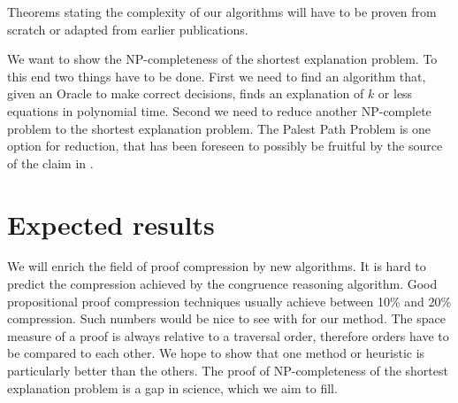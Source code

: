 Theorems stating the complexity of our algorithms will have to be proven from scratch or adapted from earlier publications.

We want to show the NP-completeness of the shortest explanation problem.
To this end two things have to be done.
First we need to find an algorithm that, given an Oracle to make correct decisions, finds an explanation of $k$ or less equations in polynomial time.
Second we need to reduce another NP-complete problem to the shortest explanation problem.
The Palest Path Problem \cite{Tiwari} is one option for reduction, that has been foreseen to possibly be fruitful by the source of the claim in \cite{Nieuwenhuis2007,Nieuwenhuis2005}.

\section{Expected results}

We will enrich the field of proof compression by new algorithms.
It is hard to predict the compression achieved by the congruence reasoning algorithm.
Good propositional proof compression techniques usually achieve between 10\% and 20\% compression.
Such numbers would be nice to see with for our method.
The space measure of a proof is always relative to a traversal order, therefore orders have to be compared to each other.
We hope to show that one method or heuristic is particularly better than the others.
The proof of NP-completeness of the shortest explanation problem is a gap in science, which we aim to fill.